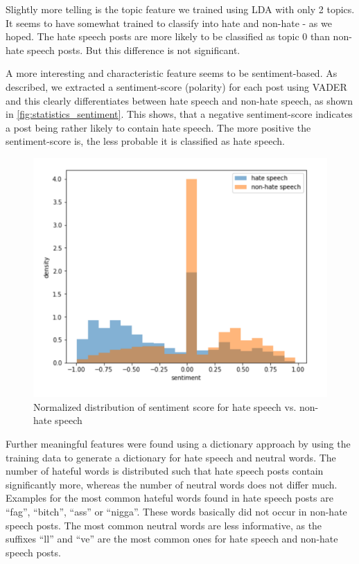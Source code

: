 \vspace{0.5cm}

Slightly more telling is the topic feature we trained using LDA with only 2 topics. It seems to have somewhat trained to classify into hate and non-hate - as we hoped. The hate speech posts are more likely to be classified as topic 0 than non-hate speech posts. But this difference is not significant.

\vspace{0.5cm}

A more interesting and characteristic feature seems to be sentiment-based. As described, we extracted a sentiment-score (polarity) for each post using VADER and this clearly differentiates between hate speech and non-hate speech, as shown in \autoref{fig:statistics_sentiment}.
This shows, that a negative sentiment-score indicates a post being rather likely to contain hate speech. The more positive the sentiment-score is, the less probable it is classified as hate speech.

\begin{figure}[ht]
	\centering
	\includegraphics[width=0.7\linewidth]{figures/statistics_sentiment.png}
	\caption{Normalized distribution of sentiment score for hate speech vs. non-hate speech}
	\label{fig:statistics_sentiment}
\end{figure}

Further meaningful features were found using a dictionary approach by using the training data to generate a dictionary for hate speech and neutral words. The number of hateful words is distributed such that hate speech posts contain significantly more, whereas the number of neutral words does not differ much.
Examples for the most common hateful words found in hate speech posts are \enquote{fag}, \enquote{bitch}, \enquote{ass} or \enquote{nigga}. These words basically did not occur in non-hate speech posts. The most common neutral words are less informative, as the suffixes \enquote{ll} and \enquote{ve} are the most common ones for hate speech and non-hate speech posts.

